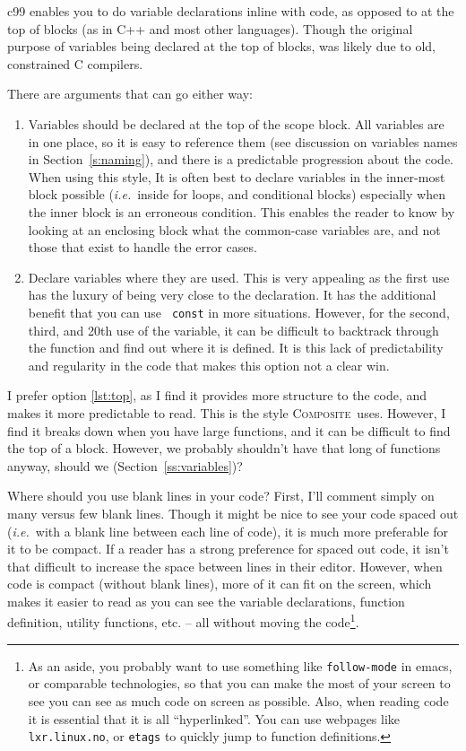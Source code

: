 \documentclass[11pt,onecolumn]{article}
\def\composite{\textsc{Composite}}
\def\ie{\textit{i.e.}}
\newcommand{\head}[1]{\vspace{0.4em}\noindent{\bf #1}}
\begin{document}
\head{Variable declaration location.} c99 enables you to do variable
declarations inline with code, as opposed to at the top of blocks (as
in C++ and most other languages).  Though the original purpose of
variables being declared at the top of blocks, was likely due to
old, constrained C compilers.  

There are arguments that can go either way:
\begin{enumerate}[itemsep=0pt,topsep=1pt,parsep=1pt,leftmargin=2.5em]
\item Variables should be declared at the top of the scope block.  All
  variables are in one place, so it is easy to reference them (see
  discussion on variables names in Section~\ref{s:naming}), and there
  is a predictable progression about the code.  When using this style,
  It is often best to declare variables in the inner-most block
  possible (\ie\ inside for loops, and conditional blocks) especially
  when the inner block is an erroneous condition.  This enables the
  reader to know by looking at an enclosing block what the common-case
  variables are, and not those that exist to handle the error
  cases.\label{lst:top}
\item Declare variables where they are used.  This is very appealing
  as the first use has the luxury of being very close to the
  declaration.  It has the additional benefit that you can use {\tt
    const} in more situations.  However, for the second, third, and
  20th use of the variable, it can be difficult to backtrack through
  the function and find out where it is defined.  It is this lack of
  predictability and regularity in the code that makes this option not
  a clear win.
\end{enumerate}

I prefer option \ref{lst:top}, as I find it provides more structure to
the code, and makes it more predictable to read.  This is the style
\composite\ uses.  However, I find it breaks down when you have large
functions, and it can be difficult to find the top of a block.
However, we probably shouldn't have that long of functions anyway,
should we (Section~\ref{ss:variables})?

\head{Use of blank lines.} Where should you use blank lines in your
code?  First, I'll comment simply on many versus few blank lines.
Though it might be nice to see your code spaced out (\ie\ with a blank
line between each line of code), it is much more preferable for it to
be compact.  If a reader has a strong preference for spaced out code,
it isn't that difficult to increase the space between lines in their
editor.  However, when code is compact (without blank lines), more of
it can fit on the screen, which makes it easier to read as you can see
the variable declarations, function definition, utility functions,
etc. -- all without moving the code\footnote{As an aside, you probably
  want to use something like {\tt follow-mode} in emacs, or comparable
  technologies, so that you can make the most of your screen to see
  you can see as much code on screen as possible.  Also, when reading
  code it is essential that it is all ``hyperlinked''.  You can use
  webpages like {\tt lxr.linux.no}, or {\tt etags} to quickly jump to
  function definitions.}.
\end{document}
